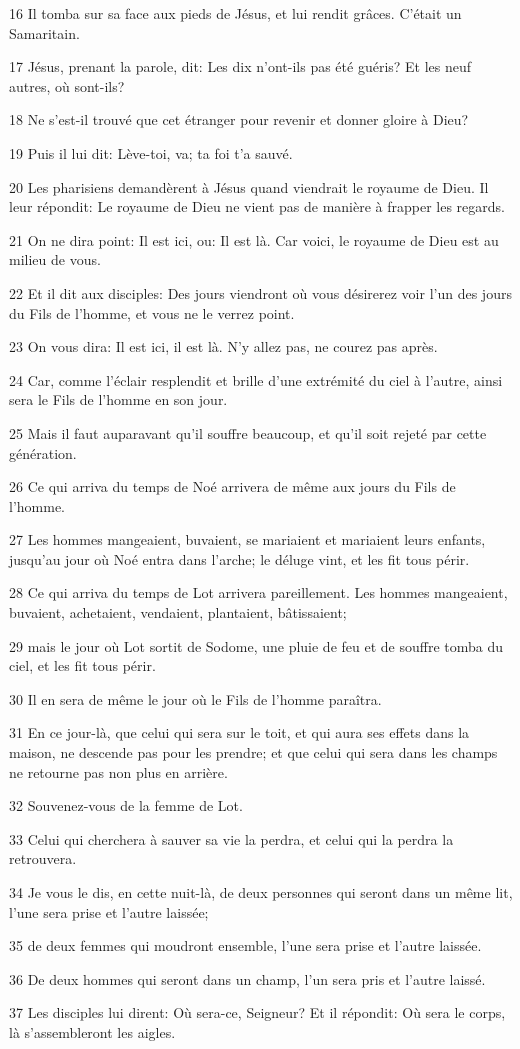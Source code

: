 \par 16 Il tomba sur sa face aux pieds de Jésus, et lui rendit grâces. C'était un Samaritain.
\par 17 Jésus, prenant la parole, dit: Les dix n'ont-ils pas été guéris? Et les neuf autres, où sont-ils?
\par 18 Ne s'est-il trouvé que cet étranger pour revenir et donner gloire à Dieu?
\par 19 Puis il lui dit: Lève-toi, va; ta foi t'a sauvé.
\par 20 Les pharisiens demandèrent à Jésus quand viendrait le royaume de Dieu. Il leur répondit: Le royaume de Dieu ne vient pas de manière à frapper les regards.
\par 21 On ne dira point: Il est ici, ou: Il est là. Car voici, le royaume de Dieu est au milieu de vous.
\par 22 Et il dit aux disciples: Des jours viendront où vous désirerez voir l'un des jours du Fils de l'homme, et vous ne le verrez point.
\par 23 On vous dira: Il est ici, il est là. N'y allez pas, ne courez pas après.
\par 24 Car, comme l'éclair resplendit et brille d'une extrémité du ciel à l'autre, ainsi sera le Fils de l'homme en son jour.
\par 25 Mais il faut auparavant qu'il souffre beaucoup, et qu'il soit rejeté par cette génération.
\par 26 Ce qui arriva du temps de Noé arrivera de même aux jours du Fils de l'homme.
\par 27 Les hommes mangeaient, buvaient, se mariaient et mariaient leurs enfants, jusqu'au jour où Noé entra dans l'arche; le déluge vint, et les fit tous périr.
\par 28 Ce qui arriva du temps de Lot arrivera pareillement. Les hommes mangeaient, buvaient, achetaient, vendaient, plantaient, bâtissaient;
\par 29 mais le jour où Lot sortit de Sodome, une pluie de feu et de souffre tomba du ciel, et les fit tous périr.
\par 30 Il en sera de même le jour où le Fils de l'homme paraîtra.
\par 31 En ce jour-là, que celui qui sera sur le toit, et qui aura ses effets dans la maison, ne descende pas pour les prendre; et que celui qui sera dans les champs ne retourne pas non plus en arrière.
\par 32 Souvenez-vous de la femme de Lot.
\par 33 Celui qui cherchera à sauver sa vie la perdra, et celui qui la perdra la retrouvera.
\par 34 Je vous le dis, en cette nuit-là, de deux personnes qui seront dans un même lit, l'une sera prise et l'autre laissée;
\par 35 de deux femmes qui moudront ensemble, l'une sera prise et l'autre laissée.
\par 36 De deux hommes qui seront dans un champ, l'un sera pris et l'autre laissé.
\par 37 Les disciples lui dirent: Où sera-ce, Seigneur? Et il répondit: Où sera le corps, là s'assembleront les aigles.

